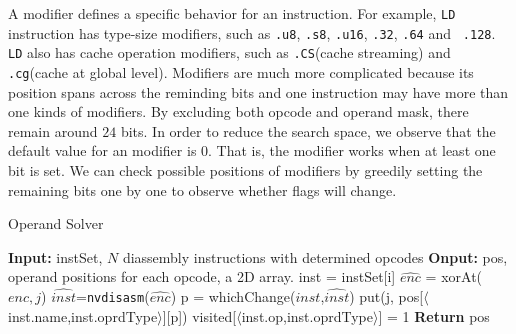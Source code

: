 A modifier defines a specific behavior for an instruction. For example,
{\tt LD} instruction has type-size modifiers, such as {\tt .u8}, {\tt .s8}, {\tt .u16}, {\tt .32}, {\tt .64} and {\tt 
.128}. {\tt LD} also has cache operation modifiers, such as {\tt .CS}(cache streaming) and {\tt .cg}(cache at global 
level). Modifiers are much more complicated because its position spans across the reminding bits and one instruction 
may have more than one kinds of modifiers. By excluding both opcode and operand mask, there remain around $24$ bits. In 
order to reduce the search space, we observe that the default value for an modifier is $0$. That is, the modifier works when at 
least one bit is set. We can check possible positions of modifiers by greedily setting the remaining bits one by one to 
observe whether flags will change.


\begin{algorithm}[htbp]
      \caption{Operand Solver}\label{algo:operand}
      {\small
      \begin{algorithmic}[1]
      \State \textbf {Input:} instSet, $N$ diassembly instructions with determined opcodes
      \State \textbf {Onput:} pos, operand positions for each opcode, a 2D array.
      \State inst = instSet[i]
      \State $\widehat{enc}$ = xorAt($enc, j$)
      \State $\widehat{inst}$={\tt nvdisasm}($\widehat{enc}$)
      \State p = whichChange($inst$,$\widehat{inst}$)
      \State put(j, pos[$\langle$inst.name,inst.oprdType$\rangle$][p])
      \State visited[$\langle$inst.op,inst.oprdType$\rangle$] = 1
      \EndIf
      \EndFor
      \EndFor
      \State \textbf{Return} pos 
  \end{algorithmic}
  }
\end{algorithm}


